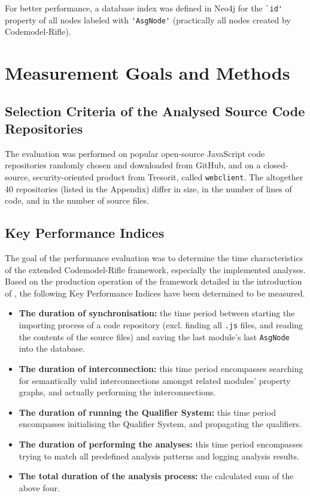 For better performance, a database index was defined in Neo4j for the \lstinline{`id'} property of all nodes labeled with \lstinline{'AsgNode'} (practically all nodes created by Codemodel-Rifle).


\section{Measurement Goals and Methods}

\subsection{Selection Criteria of the Analysed Source Code Repositories}

The evaluation was performed on popular open-source JavaScript code repositories randomly chosen and downloaded from GitHub, and on a closed-source, security-oriented product from Tresorit, called \lstinline{webclient}. The altogether 40 repositories (listed in the Appendix) differ in size, in the number of lines of code, and in the number of source files.


\subsection{Key Performance Indices}

The goal of the performance evaluation was to determine the time characteristics of the extended Codemodel-Rifle framework, especially the implemented analyses. Based on the production operation of the framework detailed in the introduction of , the following Key Performance Indices have been determined to be measured.

\begin{itemize}
\item \textbf{The duration of synchronisation:} the time period between starting the importing process of a code repository (excl. finding all \lstinline{.js} files, and reading the contents of the source files) and saving the last module's last \lstinline{AsgNode} into the database.
\item \textbf{The duration of interconnection:} this time period encompasses searching for semantically valid interconnections amongst related modules' property graphs, and actually performing the interconnections.
\item \textbf{The duration of running the Qualifier System:} this time period encompasses initialising the Qualifier System, and propagating the qualifiers.
\item \textbf{The duration of performing the analyses:} this time period encompasses trying to match all predefined analysis patterns and logging analysis results.
\item \textbf{The total duration of the analysis process:} the calculated sum of the above four.
\end{itemize}

